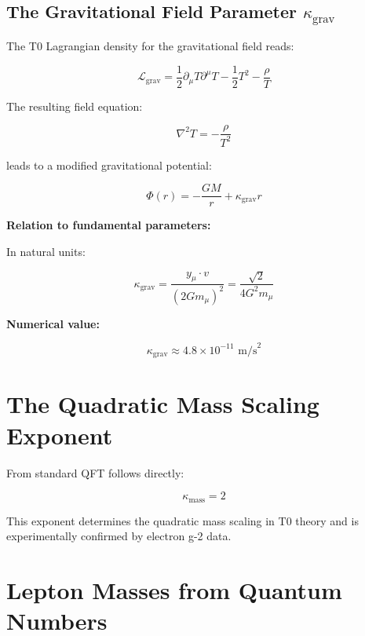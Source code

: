 \documentclass[12pt,a4paper]{article}
\begin{document}
	\subsection{The Gravitational Field Parameter $\kappa_{\text{grav}}$}
	
	The T0 Lagrangian density for the gravitational field reads:
	
	\begin{equation}
		\mathcal{L}_{\text{grav}} = \frac{1}{2}\partial_\mu T \partial^\mu T - \frac{1}{2}T^2 - \frac{\rho}{T}
	\end{equation}
	
	The resulting field equation:
	
	\begin{equation}
		\nabla^2 T = -\frac{\rho}{T^2}
	\end{equation}
	
	leads to a modified gravitational potential:
	
	\begin{equation}
		\Phi(r) = -\frac{GM}{r} + \kappa_{\text{grav}} r
	\end{equation}
	
	\textbf{Relation to fundamental parameters:}
	
	In natural units:
	
	\begin{equation}
		\kappa_{\text{grav}} = \frac{y_\mu \cdot v}{(2Gm_\mu)^2} = \frac{\sqrt{2}}{4G^2m_\mu}
	\end{equation}
	
	\textbf{Numerical value:}
	
	\begin{equation}
		\kappa_{\text{grav}} \approx 4.8 \times 10^{-11} \text{ m/s}^2
	\end{equation}
	
	\section{The Quadratic Mass Scaling Exponent}
	
	From standard QFT follows directly:
	
	\begin{equation}
		\kappa_{\text{mass}} = 2
	\end{equation}
	
	This exponent determines the quadratic mass scaling in T0 theory and is experimentally confirmed by electron g-2 data.
	
	\section{Lepton Masses from Quantum Numbers}
	
\end{document}
